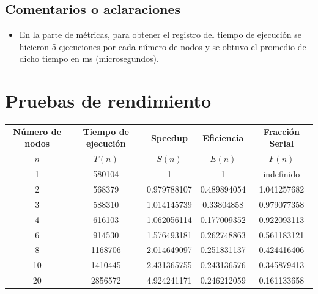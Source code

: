 \documentclass{article}
\begin{document}
    \subsection{Comentarios o aclaraciones}
    \begin{itemize}
        \item En la parte de métricas, para obtener el registro del tiempo de ejecución se hicieron 5 ejecuciones por cada número 
        de nodos y se obtuvo el promedio de dicho tiempo en ms (microsegundos).
    \end{itemize}
    \section{Pruebas de rendimiento}
    \begin{table}[H]
        \begin{center}
            \begin{tabular}{|c|c|c|c|c|}\hline
                \textbf{Número de nodos} & \textbf{Tiempo de ejecución} & \textbf{Speedup} & \textbf{Eficiencia} & \textbf{Fracción Serial} \\ 
                 $n$ & $T(n)$ & $S(n)$ & $E(n)$ & $F(n)$ \\ \hline
                 1 & 580104 & 1 & 1 & indefinido \\ \hline
                 2 & 568379 & 0.979788107 & 0.489894054 & 1.041257682 \\ \hline
                 3 & 588310 & 1.014145739 & 0.33804858 & 0.979077358 \\ \hline
                 4 & 616103 & 1.062056114 & 0.177009352 & 0.922093113 \\ \hline
                 6 & 914530 & 1.576493181 & 0.262748863 & 0.561183121 \\ \hline
                 8 & 1168706 & 2.014649097 & 0.251831137 & 0.424416406 \\ \hline
                 10 & 1410445 & 2.431365755 & 0.243136576 & 0.345879413 \\ \hline
                 20 & 2856572 & 4.924241171 & 0.246212059 & 0.161133658 \\ \hline
            \end{tabular}
        \end{center}
    \end{table}
\end{document}
